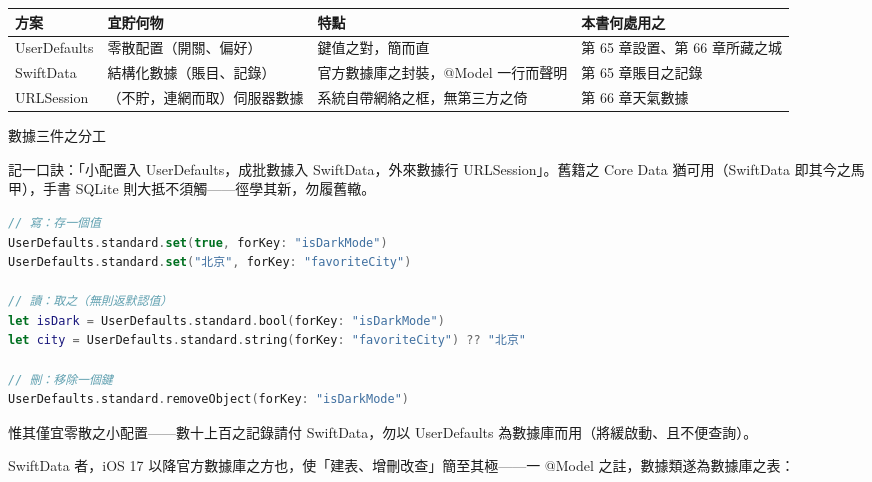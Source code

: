 


\begin{center}
\begin{tabularx}{\linewidth}{|X|X|X|X|}
\hline
\textbf{方案} & \textbf{宜貯何物} & \textbf{特點} & \textbf{本書何處用之} \tabularnewline
\hline
UserDefaults & 零散配置（開關、偏好） & 鍵值之對，簡而直 & 第 65 章設置、第 66 章所藏之城 \tabularnewline
SwiftData & 結構化數據（賬目、記錄） & 官方數據庫之封裝，@Model 一行而聲明 & 第 65 章賬目之記錄 \tabularnewline
URLSession & （不貯，連網而取）伺服器數據 & 系統自帶網絡之框，無第三方之倚 & 第 66 章天氣數據 \tabularnewline
\hline
\end{tabularx}
\end{center}

\begin{center}\small\color{gray}數據三件之分工\end{center}

記一口訣：「小配置入 UserDefaults，成批數據入 SwiftData，外來數據行 URLSession」。舊籍之 Core Data 猶可用（SwiftData 即其今之馬甲），手書 SQLite 則大抵不須觸——徑學其新，勿履舊轍。


\begin{lstlisting}[language=Swift]
// 寫：存一個值
UserDefaults.standard.set(true, forKey: "isDarkMode")
UserDefaults.standard.set("北京", forKey: "favoriteCity")

// 讀：取之（無則返默認值）
let isDark = UserDefaults.standard.bool(forKey: "isDarkMode")
let city = UserDefaults.standard.string(forKey: "favoriteCity") ?? "北京"

// 刪：移除一個鍵
UserDefaults.standard.removeObject(forKey: "isDarkMode")
\end{lstlisting}

惟其僅宜零散之小配置——數十上百之記錄請付 SwiftData，勿以 UserDefaults 為數據庫而用（將緩啟動、且不便查詢）。


SwiftData 者，iOS 17 以降官方數據庫之方也，使「建表、增刪改查」簡至其極——一 @Model 之註，數據類遂為數據庫之表：

